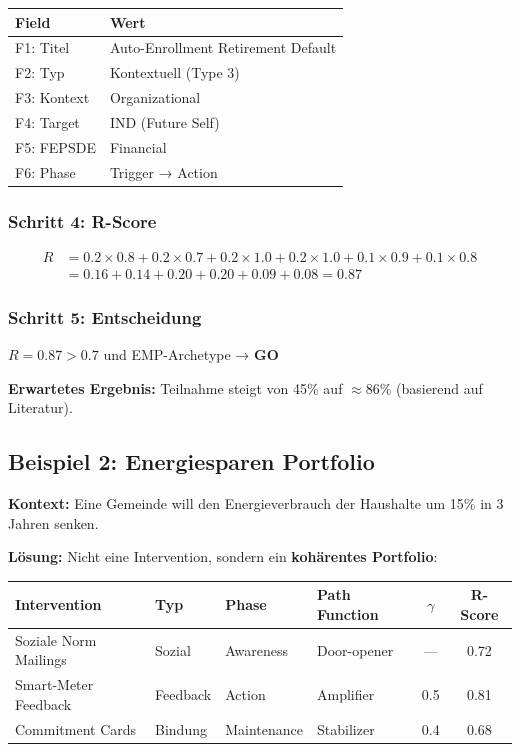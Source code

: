 \begin{center}
\begin{tabular}{@{}ll@{}}
\toprule
\textbf{Field} & \textbf{Wert} \\
\midrule
F1: Titel & Auto-Enrollment Retirement Default \\
F2: Typ & Kontextuell (Type 3) \\
F3: Kontext & Organizational \\
F4: Target & IND (Future Self) \\
F5: FEPSDE & Financial \\
F6: Phase & Trigger → Action \\
\bottomrule
\end{tabular}
\end{center}

\subsubsection{Schritt 4: R-Score}

\begin{align}
R &= 0.2 \times 0.8 + 0.2 \times 0.7 + 0.2 \times 1.0 + 0.2 \times 1.0 + 0.1 \times 0.9 + 0.1 \times 0.8 \\
&= 0.16 + 0.14 + 0.20 + 0.20 + 0.09 + 0.08 = \mathbf{0.87}
\end{align}

\subsubsection{Schritt 5: Entscheidung}

$R = 0.87 > 0.7$ und EMP-Archetype → \textbf{GO}

\textbf{Erwartetes Ergebnis:} Teilnahme steigt von 45\% auf $\approx$86\% (basierend auf Literatur).


\subsection{Beispiel 2: Energiesparen Portfolio}
\label{sec:17-example-energy}

\textbf{Kontext:} Eine Gemeinde will den Energieverbrauch der Haushalte um 15\% in 3 Jahren senken.

\textbf{Lösung:} Nicht eine Intervention, sondern ein \textbf{kohärentes Portfolio}:

\begin{table}[htbp]
\centering
\small
\begin{tabular}{@{}llllcc@{}}
\toprule
\textbf{Intervention} & \textbf{Typ} & \textbf{Phase} & \textbf{Path Function} & \textbf{$\gamma$} & \textbf{R-Score} \\
\midrule
Soziale Norm Mailings & Sozial & Awareness & Door-opener & --- & 0.72 \\
Smart-Meter Feedback & Feedback & Action & Amplifier & 0.5 & 0.81 \\
Commitment Cards & Bindung & Maintenance & Stabilizer & 0.4 & 0.68 \\
\bottomrule
\end{tabular}
\end{table}

